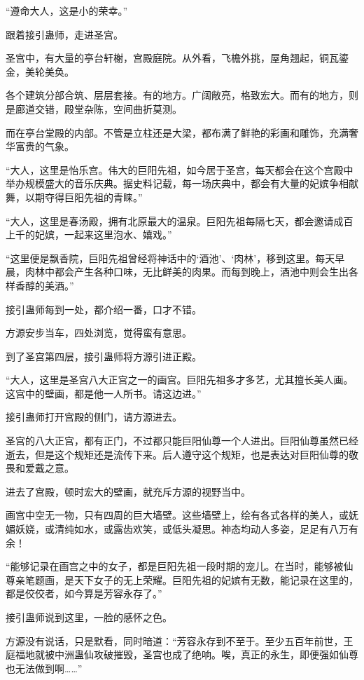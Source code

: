 \begin{this_body}
“遵命大人，这是小的荣幸。”

跟着接引蛊师，走进圣宫。

圣宫中，有大量的亭台轩榭，宫殿庭院。从外看，飞檐外挑，屋角翘起，铜瓦鎏金，美轮美奂。

各个建筑分部合筑、层层套接。有的地方。广阔敞亮，格致宏大。而有的地方，则是廊道交错，殿堂杂陈，空间曲折莫测。

而在亭台堂殿的内部。不管是立柱还是大梁，都布满了鲜艳的彩画和雕饰，充满奢华富贵的气象。

“大人，这里是怡乐宫。伟大的巨阳先祖，如今居于圣宫，每天都会在这个宫殿中举办规模盛大的音乐庆典。据史料记载，每一场庆典中，都会有大量的妃嫔争相献舞，以期夺得巨阳先祖的青睐。”

“大人，这里是春汤殿，拥有北原最大的温泉。巨阳先祖每隔七天，都会邀请成百上千的妃嫔，一起来这里泡水、嬉戏。”

“这里便是飘香院，巨阳先祖曾经将神话中的‘酒池’、‘肉林’，移到这里。每天早晨，肉林中都会产生各种口味，无比鲜美的肉果。而每到晚上，酒池中则会生出各样香醇的美酒。”

接引蛊师每到一处，都介绍一番，口才不错。

方源安步当车，四处浏览，觉得蛮有意思。

到了圣宫第四层，接引蛊师将方源引进正殿。

“大人，这里是圣宫八大正宫之一的画宫。巨阳先祖多才多艺，尤其擅长美人画。这宫中的壁画，都是他一人所书。请这边进。”

接引蛊师打开宫殿的侧门，请方源进去。

圣宫的八大正宫，都有正门，不过都只能巨阳仙尊一个人进出。巨阳仙尊虽然已经逝去，但是这个规矩还是流传下来。后人遵守这个规矩，也是表达对巨阳仙尊的敬畏和爱戴之意。

进去了宫殿，顿时宏大的壁画，就充斥方源的视野当中。

画宫中空无一物，只有四周的巨大墙壁。这些墙壁上，绘有各式各样的美人，或妩媚妖娆，或清纯如水，或露齿欢笑，或低头凝思。神态均动人多姿，足足有八万有余！

“能够记录在画宫之中的女子，都是巨阳先祖一段时期的宠儿。在当时，能够被仙尊亲笔题画，是天下女子的无上荣耀。巨阳先祖的妃嫔有无数，能记录在这里的，都是佼佼者，如今算是芳容永存了。”

接引蛊师说到这里，一脸的感怀之色。

方源没有说话，只是默看，同时暗道：“芳容永存到不至于。至少五百年前世，王庭福地就被中洲蛊仙攻破摧毁，圣宫也成了绝响。唉，真正的永生，即便强如仙尊也无法做到啊……”


\end{this_body}
